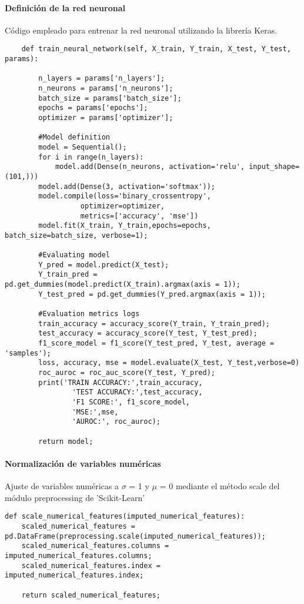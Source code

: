 \documentclass{report}
\begin{document}
\paragraph{Definición de la red neuronal}
Código empleado para entrenar la red neuronal utilizando la librería Keras. 
\begin{verbatim}
    def train_neural_network(self, X_train, Y_train, X_test, Y_test, params):

        n_layers = params['n_layers'];
        n_neurons = params['n_neurons'];
        batch_size = params['batch_size'];
        epochs = params['epochs'];
        optimizer = params['optimizer'];

        #Model definition
        model = Sequential();
        for i in range(n_layers):
            model.add(Dense(n_neurons, activation='relu', input_shape=(101,)))
        model.add(Dense(3, activation='softmax'));
        model.compile(loss='binary_crossentropy',
                  optimizer=optimizer,
                  metrics=['accuracy', 'mse'])
        model.fit(X_train, Y_train,epochs=epochs, batch_size=batch_size, verbose=1);

        #Evaluating model
        Y_pred = model.predict(X_test);
        Y_train_pred = pd.get_dummies(model.predict(X_train).argmax(axis = 1));
        Y_test_pred = pd.get_dummies(Y_pred.argmax(axis = 1));

        #Evaluation metrics logs
        train_accuracy = accuracy_score(Y_train, Y_train_pred);
        test_accuracy = accuracy_score(Y_test, Y_test_pred);
        f1_score_model = f1_score(Y_test_pred, Y_test, average = 'samples');
        loss, accuracy, mse = model.evaluate(X_test, Y_test,verbose=0)
        roc_auroc = roc_auc_score(Y_test, Y_pred);
        print('TRAIN ACCURACY:',train_accuracy,
                'TEST ACCURACY:',test_accuracy,
                'F1 SCORE:', f1_score_model,
                'MSE:',mse,
                'AUROC:', roc_auroc);
        
        return model;
\end{verbatim}


\paragraph{Normalización de variables numéricas}

Ajuste de variables numéricas a $\sigma$ = 1 y $\mu$ = 0 mediante el método scale del módulo preprocessing de 'Scikit-Learn'

\begin{verbatim}
def scale_numerical_features(imputed_numerical_features):
    scaled_numerical_features = pd.DataFrame(preprocessing.scale(imputed_numerical_features));
    scaled_numerical_features.columns = imputed_numerical_features.columns;
    scaled_numerical_features.index = imputed_numerical_features.index;
    
    return scaled_numerical_features;
\end{verbatim}
\newpage
\end{document}
